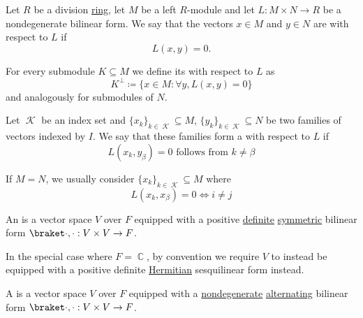 \begin{definition}\label{def:orthogonality}
  Let \( R \) be a division \hyperref[def:semiring/division_ring]{ring}, let \( M \) be a left \( R \)-module and let \( L: M \times N \to R \) be a nondegenerate bilinear form. We say that the vectors \( x \in M \) and \( y \in N \) are  with respect to \( L \) if
  \begin{equation*}
    L(x, y) = 0.
  \end{equation*}

  For every submodule \( K \subseteq M \) we define its  with respect to \( L \) as
  \begin{equation*}
    K^\perp \coloneqq \{ x \in M \colon \forall y, L(x, y) = 0 \}
  \end{equation*}
  and analogously for submodules of \( N \).

  Let \( \mscrK \) be an index set and \( \{ x_k \}_{k \in \mscrK} \subseteq M \), \( \{ y_k \}_{k \in \mscrK} \subseteq N \) be two families of vectors indexed by \( I \). We say that these families form a  with respect to \( L \) if
  \begin{equation*}
    L(x_k, y_\beta) = 0 \text{ follows from } k \neq \beta
  \end{equation*}

  If \( M = N \), we usually consider  \( \{ x_k \}_{k \in \mscrK} \subseteq M \) where
  \begin{equation*}
    L(x_k, x_\beta) = 0 \iff i \neq j
  \end{equation*}
\end{definition}

\begin{definition}\label{def:inner_product_space}
  An  is a vector space \( V \) over \( F \) equipped with a positive \hyperref[def:quadratic_form_definiteness]{definite} \hyperref[def:bilinear_form/symmetric]{symmetric} bilinear form \( \inner \cdot \cdot: V \times V \to F \).

  In the special case where \( F = \BbbC \), by convention we require \( V \) to instead be equipped with a positive definite \hyperref[def:sesquilinear_form/hermitian]{Hermitian} sesquilinear form instead.
\end{definition}

\begin{definition}\label{def:symplectic_vector_space}
  A  is a vector space \( V \) over \( F \) equipped with a \hyperref[def:bilinear_form/symmetric]{nondegenerate}  \hyperref[def:bilinear_form/alternating]{alternating} bilinear form \( \inner \cdot \cdot: V \times V \to F \).
\end{definition}

